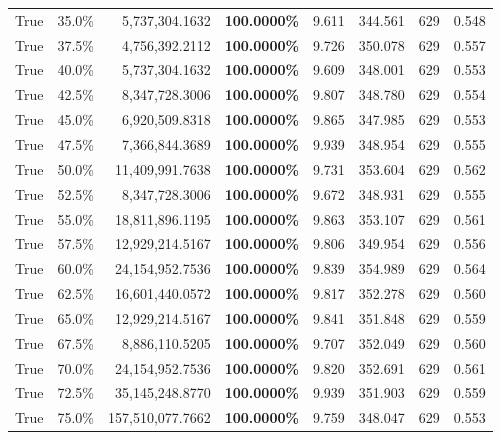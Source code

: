 \begin{table}[H]
\begin{tabular}{|m{}| m{}| r | R{0.13\textwidth}| R{0.09\textwidth}| R{0.09\textwidth}| R{0.09\textwidth}| R{0.11\textwidth}|}
True & 35.0\% & 5,737,304.1632 & \bfseries \color{red} 100.0000\% & 9.611 & 344.561 & 629 & 0.548 \\
True & 37.5\% & 4,756,392.2112 & \bfseries \color{red} 100.0000\% & 9.726 & 350.078 & 629 & 0.557 \\
True & 40.0\% & 5,737,304.1632 & \bfseries \color{red} 100.0000\% & 9.609 & 348.001 & 629 & 0.553 \\
True & 42.5\% & 8,347,728.3006 & \bfseries \color{red} 100.0000\% & 9.807 & 348.780 & 629 & 0.554 \\
True & 45.0\% & 6,920,509.8318 & \bfseries \color{red} 100.0000\% & 9.865 & 347.985 & 629 & 0.553 \\
True & 47.5\% & 7,366,844.3689 & \bfseries \color{red} 100.0000\% & 9.939 & 348.954 & 629 & 0.555 \\
True & 50.0\% & 11,409,991.7638 & \bfseries \color{red} 100.0000\% & 9.731 & 353.604 & 629 & 0.562 \\
True & 52.5\% & 8,347,728.3006 & \bfseries \color{red} 100.0000\% & 9.672 & 348.931 & 629 & 0.555 \\
True & 55.0\% & 18,811,896.1195 & \bfseries \color{red} 100.0000\% & 9.863 & 353.107 & 629 & 0.561 \\
True & 57.5\% & 12,929,214.5167 & \bfseries \color{red} 100.0000\% & 9.806 & 349.954 & 629 & 0.556 \\
True & 60.0\% & 24,154,952.7536 & \bfseries \color{red} 100.0000\% & 9.839 & 354.989 & 629 & 0.564 \\
True & 62.5\% & 16,601,440.0572 & \bfseries \color{red} 100.0000\% & 9.817 & 352.278 & 629 & 0.560 \\
True & 65.0\% & 12,929,214.5167 & \bfseries \color{red} 100.0000\% & 9.841 & 351.848 & 629 & 0.559 \\
True & 67.5\% & 8,886,110.5205 & \bfseries \color{red} 100.0000\% & 9.707 & 352.049 & 629 & 0.560 \\
True & 70.0\% & 24,154,952.7536 & \bfseries \color{red} 100.0000\% & 9.820 & 352.691 & 629 & 0.561 \\
True & 72.5\% & 35,145,248.8770 & \bfseries \color{red} 100.0000\% & 9.939 & 351.903 & 629 & 0.559 \\
True & 75.0\% & 157,510,077.7662 & \bfseries \color{red} 100.0000\% & 9.759 & 348.047 & 629 & 0.553 \\

\end{tabular}
\end{table}
